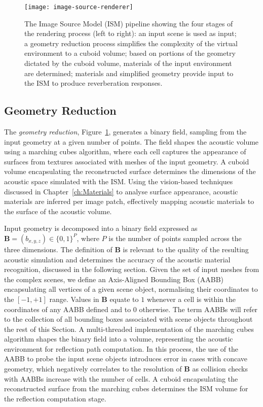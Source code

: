 \begin{figure}[htb]
    \centering
    \texttt{[image: image-source-renderer]}
    \caption{The Image Source Model (ISM) pipeline showing the four stages of the rendering process (left to right): an input scene is used as input; a geometry reduction process simplifies the complexity of the virtual environment to a cuboid volume; based on portions of the geometry dictated by the cuboid volume, materials of the input environment are determined; materials and simplified geometry provide input to the ISM to produce reverberation responses.}
\label{fig:image-source-pipeline}
\end{figure}

\subsection{Geometry Reduction}
The \emph{geometry reduction}, Figure~\ref{fig:image-source-pipeline}, generates a binary field, sampling from the input geometry at a given number of points. The field shapes the acoustic volume using a marching cubes algorithm, where each cell captures the appearance of surfaces from textures associated with meshes of the input geometry. A cuboid volume encapsulating the reconstructed surface determines the dimensions of the acoustic space simulated with the ISM. Using the vision-based techniques discussed in Chapter~\ref{ch:Materials} to analyse surface appearance, acoustic materials are inferred per image patch, effectively mapping acoustic materials to the surface of the acoustic volume.\par
Input geometry is decomposed into a binary field expressed as $\mathbf{B} = (b_{x,y,z}) \in \{ 0, 1 \}^{P}$, where $P$ is the number of points sampled across the three dimensions. The definition of $\mathbf{B}$ is relevant to the quality of the resulting acoustic simulation and determines the accuracy of the acoustic material recognition, discussed in the following section. Given the set of input meshes from the complex scenes, we define an Axis-Aligned Bounding Box (AABB) encapsulating all vertices of a given scene object, normalising their coordinates to the $[-1, +1]$ range. Values in $\mathbf{B}$ equate to $1$ whenever a cell is within the coordinates of any AABB defined and to $0$ otherwise. The term AABBs will refer to the collection of all bounding boxes associated with scene objects throughout the rest of this Section. A multi-threaded implementation of the marching cubes algorithm \citep{bourke1994polygonising, lengyel2019foundations} shapes the binary field into a volume, representing the acoustic environment for reflection path computation. In this process, the use of the AABB to probe the input scene objects introduces error in cases with concave geometry, which negatively correlates to the resolution of $\mathbf{B}$ as collision checks with AABBs increase with the number of cells. A cuboid encapsulating the reconstructed surface from the marching cubes determines the ISM volume for the reflection computation stage.\par

